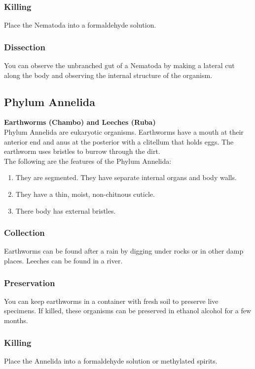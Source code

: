 \subsubsection{Killing}
Place the Nematoda into a formaldehyde solution.

\subsubsection{Dissection}
You can observe the unbranched gut of a Nematoda by making a lateral cut along the body and observing the internal structure of the organism.

\subsection{Phylum Annelida}

\textbf{Earthworms (Chambo) and Leeches (Ruba)}\\ 
Phylum Annelida are eukaryotic organisms. Earthworms have a mouth at their anterior end and anus at the posterior with a clitellum that holds eggs. The earthworm uses bristles to burrow through the dirt. \\
The following are the features of the Phylum Annelida:
\begin{enumerate}
\item{They are segmented. They have separate internal organs and body walls.}
\item{They have a thin, moist, non-chitnous cuticle.}
\item{There body has external bristles.}
\end{enumerate}

\subsubsection{Collection}
Earthworms can be found after a rain by digging under rocks or in other damp places. Leeches can be found in a river.

\subsubsection{Preservation} 
You can keep earthworms in a container with fresh soil to preserve live specimens. If killed, these organisms can be preserved in ethanol alcohol for a few months. 

\subsubsection{Killing}
Place the Annelida into a formaldehyde solution or methylated spirits.

